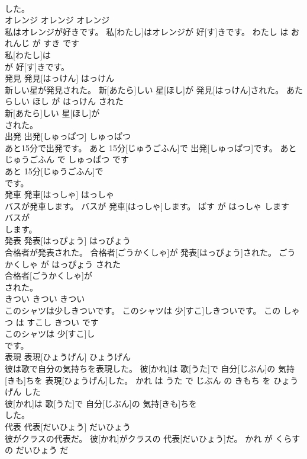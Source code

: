 \documentclass[8pt]{extreport}
\begin{document}
\begin{CJK}{UTF8}{min}
\\	した。		
\\	オレンジ	オレンジ	オレンジ	
\\	私はオレンジが好きです。	私[わたし]はオレンジが 好[す]きです。	わたし は おれんじ が すき です	
\\	私[わたし]は
\\	が 好[す]きです。		
\\	発見	発見[はっけん]	はっけん	
\\	新しい星が発見された。	新[あたら]しい 星[ほし]が 発見[はっけん]された。	あたらしい ほし が はっけん された	
\\	新[あたら]しい 星[ほし]が
\\	された。		
\\	出発	出発[しゅっぱつ]	しゅっぱつ	
\\	あと15分で出発です。	あと 15分[じゅうごふん]で 出発[しゅっぱつ]です。	あと じゅうごふん で しゅっぱつ です	
\\	あと 15分[じゅうごふん]で
\\	です。		
\\	発車	発車[はっしゃ]	はっしゃ	
\\	バスが発車します。	バスが 発車[はっしゃ]します。	ばす が はっしゃ します	
\\	バスが
\\	します。		
\\	発表	発表[はっぴょう]	はっぴょう	
\\	合格者が発表された。	合格者[ごうかくしゃ]が 発表[はっぴょう]された。	ごうかくしゃ が はっぴょう された	
\\	合格者[ごうかくしゃ]が
\\	された。		
\\	きつい	きつい	きつい	
\\	このシャツは少しきついです。	このシャツは 少[すこ]しきついです。	この しゃつ は すこし きつい です	
\\	このシャツは 少[すこ]し
\\	です。		
\\	表現	表現[ひょうげん]	ひょうげん	
\\	彼は歌で自分の気持ちを表現した。	彼[かれ]は 歌[うた]で 自分[じぶん]の 気持[きも]ちを 表現[ひょうげん]した。	かれ は うた で じぶん の きもち を ひょうげん した	
\\	彼[かれ]は 歌[うた]で 自分[じぶん]の 気持[きも]ちを
\\	した。		
\\	代表	代表[だいひょう]	だいひょう	
\\	彼がクラスの代表だ。	彼[かれ]がクラスの 代表[だいひょう]だ。	かれ が くらす の だいひょう だ	

\end{CJK}
\end{document}
